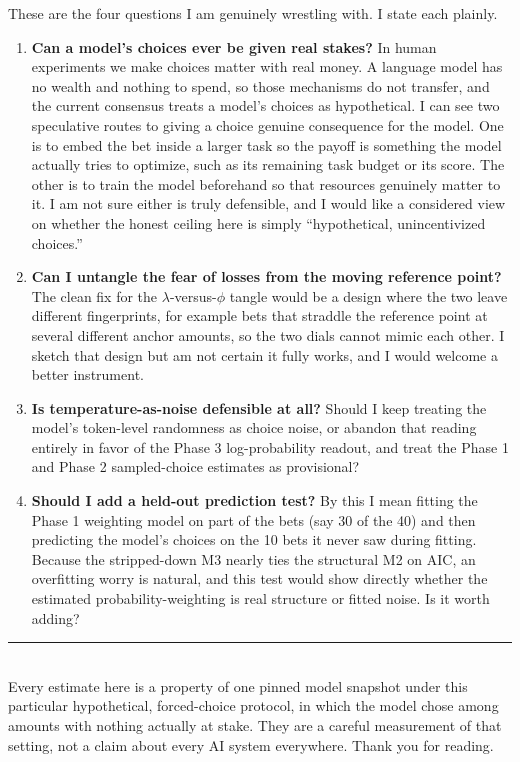 \documentclass[11pt]{article}
\begin{document}
These are the four questions I am genuinely wrestling with. I state each plainly.

\begin{enumerate}[leftmargin=1.5em]
\item \textbf{Can a model's choices ever be given real stakes?} In human experiments we make choices
matter with real money. A language model has no wealth and nothing to spend, so those mechanisms do not
transfer, and the current consensus treats a model's choices as hypothetical. I can see two speculative
routes to giving a choice genuine consequence for the model. One is to embed the bet inside a larger task
so the payoff is something the model actually tries to optimize, such as its remaining task budget or its
score. The other is to train the model beforehand so that resources genuinely matter to it. I am not sure
either is truly defensible, and I would like a considered view on whether the honest ceiling here is simply
``hypothetical, unincentivized choices.''
\item \textbf{Can I untangle the fear of losses from the moving reference point?} The clean fix for the
$\lambda$-versus-$\phi$ tangle would be a design where the two leave different fingerprints, for example
bets that straddle the reference point at several different anchor amounts, so the two dials cannot mimic
each other. I sketch that design but am not certain it fully works, and I would welcome a better instrument.
\item \textbf{Is temperature-as-noise defensible at all?} Should I keep treating the model's token-level
randomness as choice noise, or abandon that reading entirely in favor of the Phase 3 log-probability
readout, and treat the Phase 1 and Phase 2 sampled-choice estimates as provisional?
\item \textbf{Should I add a held-out prediction test?} By this I mean fitting the Phase 1 weighting model
on part of the bets (say 30 of the 40) and then predicting the model's choices on the 10 bets it never saw
during fitting. Because the stripped-down M3 nearly ties the structural M2 on AIC, an overfitting worry is
natural, and this test would show directly whether the estimated probability-weighting is real structure or
fitted noise. Is it worth adding?
\end{enumerate}

\vspace{6pt}
{\color{rulegray}\rule{\linewidth}{0.8pt}}\\[3pt]
{\footnotesize\color{mutegray} Every estimate here is a property of one pinned model snapshot under this
particular hypothetical, forced-choice protocol, in which the model chose among amounts with nothing
actually at stake. They are a careful measurement of that setting, not a claim about every AI system
everywhere. Thank you for reading.}
\end{document}
